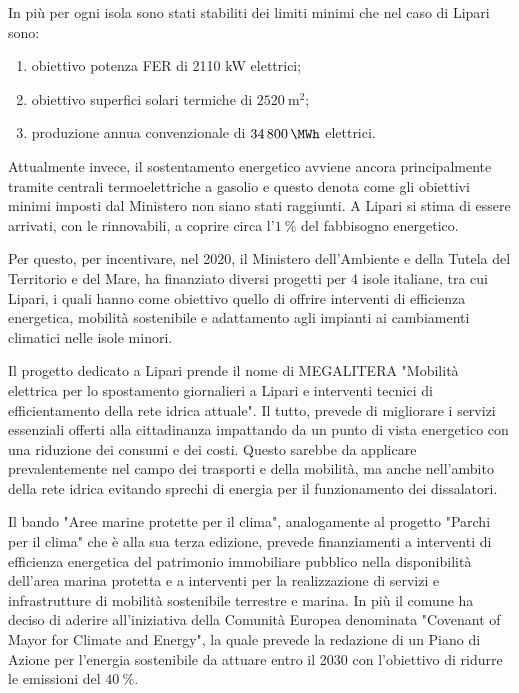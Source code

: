 \documentclass[fleqn,11pt]{SelfArx} %
\begin{document}
In più per ogni isola sono stati stabiliti dei limiti minimi che nel caso di Lipari sono:
\begin{enumerate}
	\item obiettivo potenza FER di 2110  kW elettrici;
	\item obiettivo superfici solari termiche di \(\SI{2520}{\m\squared}\);
	\item produzione annua convenzionale di \(\SI{34800}{\MWh}\) elettrici.
\end{enumerate}

Attualmente invece, il  sostentamento energetico  avviene ancora principalmente tramite centrali termoelettriche a gasolio e questo denota come gli obiettivi minimi imposti dal Ministero non siano stati raggiunti. A Lipari si stima di essere arrivati, con le rinnovabili, a coprire circa l'\(\SI{1}{\percent}\) del fabbisogno energetico.  

Per questo, per incentivare, nel 2020, il Ministero dell'Ambiente e della Tutela del Territorio e del Mare, ha finanziato diversi progetti per 4 isole italiane, tra cui Lipari, i quali hanno come obiettivo quello di offrire interventi di efficienza energetica, mobilità sostenibile e adattamento agli impianti ai cambiamenti climatici nelle isole minori. 

Il progetto dedicato a Lipari prende il nome di MEGALITERA "Mobilità elettrica per lo spostamento giornalieri a Lipari e interventi tecnici di efficientamento della rete idrica attuale". Il tutto, prevede di migliorare i servizi essenziali offerti alla cittadinanza impattando da un punto di vista energetico con una riduzione dei consumi e dei costi. Questo sarebbe da applicare prevalentemente nel campo dei trasporti e della mobilità, ma anche nell'ambito della rete idrica evitando sprechi di energia per il funzionamento dei dissalatori. 

Il bando "Aree marine protette per il clima", analogamente al progetto "Parchi per il clima" che è alla sua terza edizione, prevede finanziamenti a interventi di efficienza energetica del patrimonio immobiliare pubblico nella disponibilità dell'area marina protetta e a interventi per la realizzazione di servizi e infrastrutture di mobilità sostenibile terrestre e marina.
In più il comune ha deciso di aderire all'iniziativa della Comunità Europea denominata "Covenant of Mayor for Climate and Energy", la quale prevede la redazione di un Piano di Azione per l'energia sostenibile da attuare entro il 2030 con l'obiettivo di ridurre le emissioni del \(\SI{40}{\percent}\).
\end{document}
